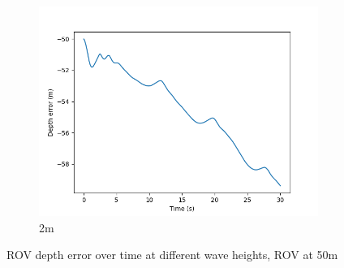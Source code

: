 \documentclass[class=article, crop=false]{standalone}
\begin{document}
\begin{figure}
\begin{subfigure}[b]{0.48\textwidth}
        \includegraphics{scenario1/rov-50m/2.0m/rov_depth_error_uncontrolled}
        \caption{2m}
        \label{}
    \end{subfigure}

    \caption{ROV depth error over time at different wave heights, ROV at 50m}
\end{figure}
\end{document}
